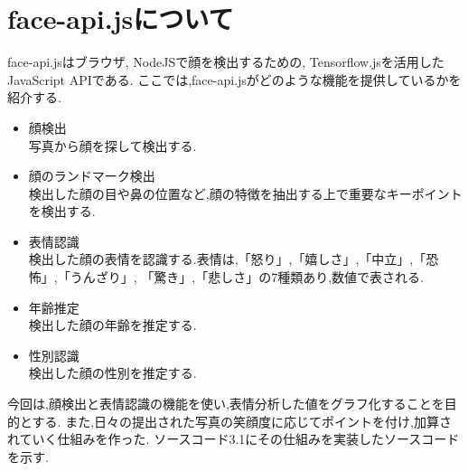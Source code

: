 \section{face-api.jsについて}
\label{sec:reference_bib}
face-api.jsはブラウザ, NodeJSで顔を検出するための,
Tensorflow.jsを活用したJavaScript APIである.
ここでは,face-api.jsがどのような機能を提供しているかを紹介する.
\begin{itemize}
	\item 顔検出 \\
	写真から顔を探して検出する. \\

	\item 顔のランドマーク検出 \\
	検出した顔の目や鼻の位置など,顔の特徴を抽出する上で重要なキーポイントを検出する. \\

	\item 表情認識 \\
	検出した顔の表情を認識する.表情は,「怒り」,「嬉しさ」,「中立」,「恐怖」,「うんざり」,
	「驚き」,「悲しさ」の7種類あり,数値で表される. \\

	\item 年齢推定 \\
	検出した顔の年齢を推定する. \\

	\item 性別認識 \\
	検出した顔の性別を推定する. \\

\end{itemize}
今回は,顔検出と表情認識の機能を使い,表情分析した値をグラフ化することを目的とする.
また,日々の提出された写真の笑顔度に応じてポイントを付け,加算されていく仕組みを作った.
ソースコード3.1にその仕組みを実装したソースコードを示す. \\

\renewcommand{\lstlistingname}{ソースコード}

